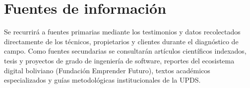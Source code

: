 \section{Fuentes de información}

Se recurrirá a fuentes primarias mediante los testimonios y datos recolectados directamente de los técnicos, propietarios y clientes durante el diagnóstico de campo. Como fuentes secundarias se consultarán artículos científicos indexados, tesis y proyectos de grado de ingeniería de software, reportes del ecosistema digital boliviano (Fundación Emprender Futuro), textos académicos especializados y guías metodológicas institucionales de la UPDS.